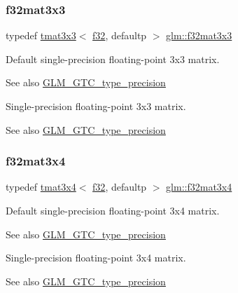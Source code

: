 \subsubsection{\texorpdfstring{f32mat3x3}{f32mat3x3}}
{\footnotesize\ttfamily typedef \hyperlink{structglm_1_1tmat3x3}{tmat3x3}$<$ \hyperlink{group__gtc__type__precision_ga0ec999b57f5330d9021256e96038df04}{f32}, defaultp $>$ \hyperlink{group__gtc__type__precision_ga715b36ea1e2d1ffaaef7517cc78b3877}{glm\+::f32mat3x3}}

Default single-\/precision floating-\/point 3x3 matrix. \begin{DoxySeeAlso}{See also}
\hyperlink{group__gtc__type__precision}{G\+L\+M\+\_\+\+G\+T\+C\+\_\+type\+\_\+precision}
\end{DoxySeeAlso}
Single-\/precision floating-\/point 3x3 matrix. \begin{DoxySeeAlso}{See also}
\hyperlink{group__gtc__type__precision}{G\+L\+M\+\_\+\+G\+T\+C\+\_\+type\+\_\+precision} 
\end{DoxySeeAlso}
\mbox{\label{group__gtc__type__precision_ga9995b357aa1e9603adad780cfde1aa07}} 
\subsubsection{\texorpdfstring{f32mat3x4}{f32mat3x4}}
{\footnotesize\ttfamily typedef \hyperlink{structglm_1_1tmat3x4}{tmat3x4}$<$ \hyperlink{group__gtc__type__precision_ga0ec999b57f5330d9021256e96038df04}{f32}, defaultp $>$ \hyperlink{group__gtc__type__precision_ga9995b357aa1e9603adad780cfde1aa07}{glm\+::f32mat3x4}}

Default single-\/precision floating-\/point 3x4 matrix. \begin{DoxySeeAlso}{See also}
\hyperlink{group__gtc__type__precision}{G\+L\+M\+\_\+\+G\+T\+C\+\_\+type\+\_\+precision}
\end{DoxySeeAlso}
Single-\/precision floating-\/point 3x4 matrix. \begin{DoxySeeAlso}{See also}
\hyperlink{group__gtc__type__precision}{G\+L\+M\+\_\+\+G\+T\+C\+\_\+type\+\_\+precision} 
\end{DoxySeeAlso}
\mbox{\label{group__gtc__type__precision_ga47bc5ddfbd368423c9b762c03ba7e77f}} 
